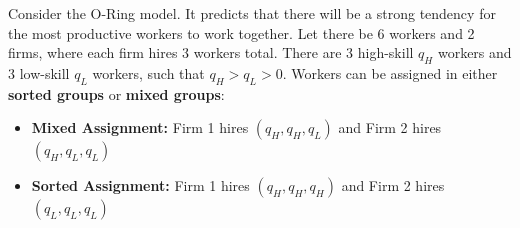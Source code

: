 \documentclass[12pt]{exam}
\begin{document}
\begin{questions}

\newpage 

\question 
Consider the O-Ring model.
It predicts that there will be a strong tendency for the most productive workers to work together. 
Let there be 6 workers and 2 firms, where each firm hires 3 workers total.
There are 3 high-skill $q_{H}$ workers and 3 low-skill $q_{L}$ workers, such that $q_{H} > q_{L} > 0$.
Workers can be assigned in either \textbf{sorted groups} or \textbf{mixed groups}:
\begin{itemize}
  \item \textbf{Mixed Assignment:} Firm 1 hires $(q_{H},q_{H},q_{L})$ and Firm 2 hires $(q_{H},q_{L},q_{L})$
  \item \textbf{Sorted Assignment:} Firm 1 hires $(q_{H},q_{H},q_{H})$ and Firm 2 hires $(q_{L},q_{L},q_{L})$
\end{itemize}


\end{questions}
\end{document}
